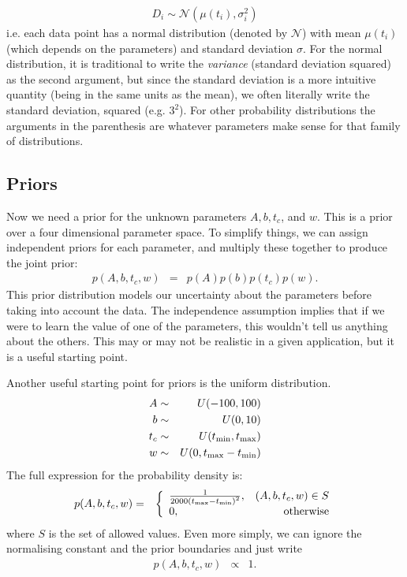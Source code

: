 \begin{eqnarray}
D_i \sim \mathcal{N}\left(\mu(t_i), \sigma_i^2\right)
\end{eqnarray}
i.e. each data point has a normal distribution (denoted by $\mathcal{N}$)
with mean $\mu(t_i)$ (which
depends on the parameters) and standard deviation $\sigma$. For the normal
distribution, it is traditional to write the {\it variance} (standard deviation
squared) as the second argument, but since the standard deviation is a more
intuitive quantity (being in the same units as the mean), we often literally
write the standard deviation, squared (e.g. $3^2$). For other probability
distributions the arguments in the parenthesis are whatever parameters make
sense for that family of distributions.

\subsection{Priors}
Now we need a prior for the unknown parameters $A, b, t_c$, and $w$. This is
a prior over a four dimensional parameter space. To simplify things, we can
assign independent priors for each parameter, and multiply these together
to produce the joint prior:
\begin{eqnarray}
p(A, b, t_c, w) &=& p(A)p(b)p(t_c)p(w).
\end{eqnarray}
This prior distribution models our uncertainty about the parameters before
taking into account the data. The independence assumption implies that if we
were to learn the value of one of the parameters, this wouldn't tell us anything
about the others. This may or may not be realistic in a given application, but
it is a useful starting point.

Another useful starting point for priors is the uniform distribution.
\begin{eqnarray}
A &\sim& U(-100, 100)\\
b &\sim& U(0, 10)\\
t_c &\sim& U(t_{\rm min}, t_{\rm max})\\
w &\sim& U(0, t_{\rm max} - t_{\rm min})
\end{eqnarray}
The full expression for the probability density is:
\begin{eqnarray}
p(A, b, t_c, w) &=&
\left\{
\begin{array}{lr}
\frac{1}{2000\left(t_{\rm max} - t_{\rm min}\right)^2}, & (A, b, t_c, w) \in S\\
0, & \textnormal{otherwise}
\end{array}
\right.
\end{eqnarray}
where $S$ is the set of allowed values. Even more simply, we can ignore the
normalising constant and the prior boundaries and just write
\begin{eqnarray}
p(A, b, t_c, w) &\propto& 1.
\end{eqnarray}

